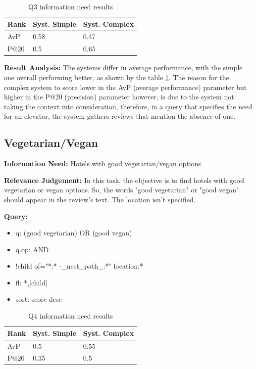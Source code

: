 \documentclass[sigconf]{acmart}
\begin{document}
\begin{table}[h]
\caption{Q3 information need results}
\label{tab:q3}
\begin{tabular}{lll}
\toprule
Rank & Syst. Simple & Syst. Complex\\
\midrule
AvP & 0.58 & 0.47  \\
P@20 & 0.5 & 0.65 \\
\bottomrule
\end{tabular}
\end{table}

\textbf{Result Analysis:} The systems differ in average performance, with the simple one overall performing better, as shown by the table \ref{tab:q3}. The reason for the complex system to score lower in the AvP (average performance) parameter but higher in the P@20 (precision) parameter however, is due to the system not taking the context into consideration, therefore, in a query that specifies the need for an elevator, the system gathers reviews that mention the absence of one.




\subsection{Vegetarian/Vegan}


\textbf{Information Need:} Hotels with good vegetarian/vegan options

\textbf{Relevance Judgement:} In this task, the objective is to find hotels with good vegetarian or vegan options. So, the words "good vegetarian" or "good vegan" should appear in the review's text. The location isn't specified.

\textbf{Query:}

\begin{itemize}
    \item q: (good vegetarian) OR (good vegan)
    \item q.op: AND
    \item {!child of="*:* -\_nest\_path\_:*"} location:*
    \item fl: *,[child]
    \item sort: score desc
\end{itemize}

\begin{table}[h]
\caption{Q4 information need results}
\label{tab:q4}
\begin{tabular}{lll}
\toprule
Rank & Syst. Simple & Syst. Complex\\
\midrule
AvP & 0.5 & 0.55  \\
P@20 & 0.35 & 0.5 \\
\bottomrule
\end{tabular}
\end{table}
\end{document}
